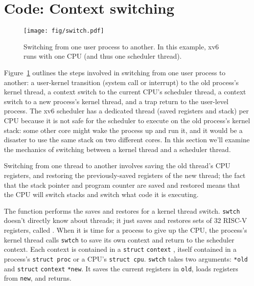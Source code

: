 \section{Code: Context switching}

\begin{figure}[t]
\center
\texttt{[image: fig/switch.pdf]}
\caption{Switching from one user process to another.  In this example, xv6 runs with one CPU (and thus one scheduler thread).}
\label{fig:switch}
\end{figure}

Figure~\ref{fig:switch} 
outlines the steps involved in switching from one
user process to another:
a user-kernel transition (system
call or interrupt) to the old process's kernel thread,
a context switch to the current CPU's scheduler thread, a context
switch to a new process's kernel thread, and a trap return
to the user-level process.
The xv6 scheduler has a dedicated thread (saved registers and stack)
per CPU because
it is not safe for the scheduler to execute on
the old process's kernel stack: some other core might
wake the process up and run it, and it would be a disaster
to use the same stack on two different cores.
%
%
%
In this section we'll examine the mechanics of switching
between a kernel thread and a scheduler thread.

Switching from one thread to another involves saving the old thread's
CPU registers, and restoring the previously-saved registers of the
new thread; the fact that
the stack pointer and program counter
are saved and restored means that the CPU will switch stacks and
switch what code it is executing.

The function
performs the saves and restores for a kernel thread switch.
\lstinline{swtch}
doesn't directly know about threads; it just saves and
restores sets of 32 RISC-V registers, called 
.
When it is time for a process to give up the CPU,
the process's kernel thread calls
\lstinline{swtch}
to save its own context and return to the scheduler context.
Each context is contained in a
\lstinline{struct}
\lstinline{context}
,
itself contained in a process's
\lstinline{struct proc}
or a CPU's
\lstinline{struct cpu}.
\lstinline{swtch}
takes two arguments:
\lstinline{*old}
and
\lstinline{struct}
\lstinline{context}
\lstinline{*new}.
It saves the current registers in
\lstinline{old},
loads registers from 
\lstinline{new},
and returns.

